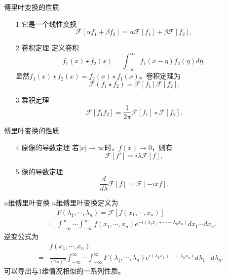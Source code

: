 \documentclass[11pt]{beamer}
\begin{document}
\begin{frame}{傅里叶变换的性质}

\begin{itemize}
\item [1] 它是一个线性变换
\begin{equation}
\mathscr{F} [ \alpha f_1 + \beta f_2 ] = \alpha \mathscr{F}[f_1] + \beta \mathscr{F}[ f_2 ],
\end{equation}

\item [2] 卷积定理
定义卷积
\begin{equation}
f_1(x) \star f_2(x) = \int^\infty_{-\infty} f_1(x-\eta) f_2(\eta) d \eta,
\end{equation}
显然$f_1(x) \star f_2(x) = f_2(x) \star f_1(x)$。卷积定理为
\begin{equation}
\mathscr{F}(f_1 \star f_2) = \mathscr{F}[f_1] \mathscr{F}[f_2].
\end{equation}

\item [3] 乘积定理
\begin{equation}
\mathscr{F}[f_1 f_2] = \frac{1}{2\pi}\mathscr{F}[f_1] \star \mathscr{F}[f_2].
\end{equation}

\end{itemize}

\end{frame}

\begin{frame}{傅里叶变换的性质}
\begin{itemize}
\item [4] 原像的导数定理
若$|x| \rightarrow \infty$时，$f(x) \rightarrow 0$，则有
\begin{equation}
\mathscr{F}[f'] = i \lambda \mathscr{F}[f],
\end{equation}

\item [5] 像的导数定理
\begin{equation}
\frac{d}{d \lambda} \mathscr{F}[f] = \mathscr{F}[ -i x f].
\end{equation}
\end{itemize}
\end{frame}

\begin{frame}{$n$维傅里叶变换}
$n$维傅里叶变换定义为
\begin{eqnarray}
&& F(\lambda_1, \cdots, \lambda_n) = \mathscr{F}[ f(x_1,\cdots,x_n) ]
\nonumber\\
&=& \int^\infty_{-\infty} \cdots \int^\infty_{-\infty} f(x_1, \cdots, x_n) 
e^{-i(\lambda_1 x_1 + \cdots + \lambda_n x_n )} d x_1 \cdots d x_n.
\end{eqnarray}
逆变公式为
\begin{eqnarray}
&&f(x_1, \cdots, x_n) 
\nonumber\\
&=& 
\frac{1}{ (2\pi)^n } \int^\infty_{-\infty} \cdots \int^\infty_{-\infty}
F(\lambda_1, \cdots, \lambda_n) e^{ i(\lambda_1 x_1 + \cdots + \lambda_n x_n )}
d \lambda_1 \cdots d \lambda_n.
\end{eqnarray}
可以导出与1维情况相似的一系列性质。
\end{frame}
\end{document}
